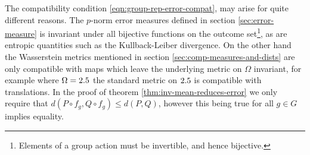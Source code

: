 The compatibility condition \eqref{eqn:group-rep-error-compat}, may arise for quite different reasons. The $p$-norm error measures defined in section \ref{sec:error-measure} is invariant under all bijective functions on the outcome set\footnote{Elements of a group action must be invertible, and hence bijective.}, as are entropic quantities such as the Kullback-Leiber divergence. On the other hand the Wasserstein metrics mentioned in section \ref{sec:comp-measures-and-dists} are only compatible with maps which leave the underlying metric on $\Omega$ invariant, for example where $\Omega = 2.5$ the standard metric on $2.5$ is compatible with translations. In the proof of theorem \ref{thm:inv-mean-reduces-error} we only require that $d(P\circ f_g, Q\circ f_g) \leq d(P,Q)$, however this being true for all $g\in G$ implies equality.

